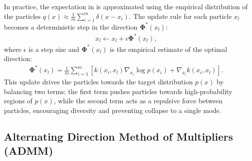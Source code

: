 In practice, the expectation in  is approximated using the empirical distribution of the particles 
$q(x) \approx \frac{1}{m} \sum_{i=1}^m \delta(x - x_i)$. 
The update rule for each particle $x_l$ becomes a deterministic step in the direction ${\boldsymbol{\Phi}}^{*}(x_l)$:
\begin{equation}
\begin{aligned}
x_l \leftarrow x_l + \epsilon {\boldsymbol{\Phi}}^{*}(x_l),
\label{eq:svgd_update_rule}
\end{aligned}
\end{equation}
where $\epsilon$ is a step size and ${\boldsymbol{\Phi}}^{*}(x_l)$ is the empirical estimate of the optimal direction:
\begin{equation}
\begin{aligned}
{\boldsymbol{\Phi}}^{*}(x_l) = \frac{1}{m}\sum_{i=1}^m \left[ k(x_i, x_l) \nabla_{x_i} \log p(x_i) + \nabla_{x_i} k(x_i, x_l) \right].
\label{eq:svgd_practical_update}
\end{aligned}
\end{equation}
This update drives the particles towards the target distribution $p(x)$ by balancing two terms: the first term pushes particles towards high-probability regions of $p(x)$, while the second term acts as a repulsive force between particles, encouraging diversity and preventing collapse to a single mode.

\subsection{Alternating Direction Method of Multipliers (ADMM)}
\label{subsec:admm}

